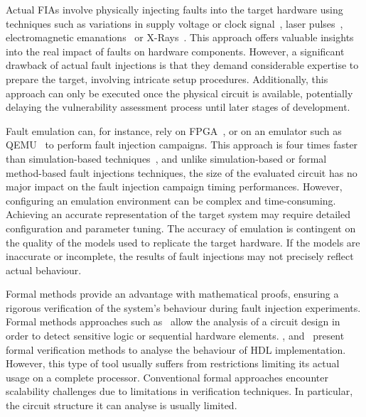 Actual FIAs involve physically injecting faults into the target hardware using techniques such as variations in supply voltage or clock signal~\cite{BCNTW-06-procieee, BFP-19-tches}, laser pulses~\cite{BCNTW-06-procieee, CGVCBLC-22-cardis}, electromagnetic emanations~\cite{BCNTW-06-procieee} or X-Rays~\cite{GBD-23-paine}.
This approach offers valuable insights into the real impact of faults on hardware components.
However, a significant drawback of actual fault injections is that they demand considerable expertise to prepare the target, involving intricate setup procedures.
Additionally, this approach can only be executed once the physical circuit is available, potentially delaying the vulnerability assessment process until later stages of development.

Fault emulation can, for instance, rely on FPGA~\cite{CMLCVR-11-crypto}, or on an emulator such as QEMU~\cite{HGASO-21-fdtc,BLK-23-access} to perform fault injection campaigns. This approach is four times faster than simulation-based techniques~\cite{NNHRS-14-dsd}, and unlike simulation-based or formal method-based fault injections techniques, the size of the evaluated circuit has no major impact on the fault injection campaign timing performances.
However, configuring an emulation environment can be complex and time-consuming. Achieving an accurate representation of the target system may require detailed configuration and parameter tuning. The accuracy of emulation is contingent on the quality of the models used to replicate the target hardware. If the models are inaccurate or incomplete, the results of fault injections may not precisely reflect actual behaviour.

Formal methods provide an advantage with mathematical proofs, ensuring a rigorous verification of the system's behaviour during fault injection experiments. Formal methods approaches such as~\cite{BSSMG-21-tches} allow the analysis of a circuit design in order to detect sensitive logic or sequential hardware elements. \cite{ANR-18-ices}, \cite{BBCFGS-19-esorics} and~\cite{SVPMRDKMS-24-eprint} present formal verification methods to analyse the behaviour of HDL implementation.
However, this type of tool usually suffers from restrictions limiting its actual usage on a complete processor.
Conventional formal approaches encounter scalability challenges due to limitations in verification techniques.
In particular, the circuit structure it can analyse is usually limited.

